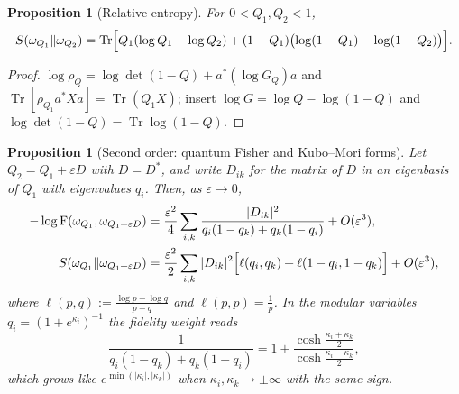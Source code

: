 \documentclass[11pt]{article}
\theoremstyle{accent}
\newtheorem{proposition}[theorem]{Proposition}
\theoremstyle{definition}
\newcommand{\Tr}{\operatorname{Tr}}
\newcommand{\eps}{\varepsilon}
\newcommand{\Fid}{\operatorname{F}}
\begin{document}
\begin{proposition}[Relative entropy]\label{prop:finite-relent}
For \(0<Q_1,Q_2<1\),
\begin{equation}\label{eq:finite-relent}
 S(\omega_{Q_1}\Vert\omega_{Q_2})
 =\Tr\Bigl[Q_1(\log Q_1-\log Q_2)+(1-Q_1)\bigl(\log(1-Q_1)-\log(1-Q_2)\bigr)\Bigr].
\end{equation}
\end{proposition}

\begin{proof}
\(\log\rho_Q=\log\det(1-Q)+a^*(\log G_Q)a\) and \(\Tr[\rho_{Q_1}a^*Xa]=\Tr(Q_1X)\); insert \(\log G=\log Q-\log(1-Q)\) and \(\log\det(1-Q)=\Tr\log(1-Q)\).
\end{proof}

\begin{proposition}[Second order: quantum Fisher and Kubo--Mori forms]\label{prop:second-order}
Let \(Q_2=Q_1+\eps D\) with \(D=D^*\), and write \(D_{ik}\) for the matrix of \(D\) in an eigenbasis of \(Q_1\) with eigenvalues \(q_i\).  Then, as \(\eps\to0\),
\begin{align}
 -\log\Fid(\omega_{Q_1},\omega_{Q_1+\eps D})
 &=\frac{\eps^2}{4}\sum_{i,k}\frac{|D_{ik}|^2}{q_i(1-q_k)+q_k(1-q_i)}+O(\eps^3),
 \label{eq:qfi}\\
 S(\omega_{Q_1}\Vert\omega_{Q_1+\eps D})
 &=\frac{\eps^2}{2}\sum_{i,k}|D_{ik}|^2\Bigl[\ell(q_i,q_k)+\ell(1-q_i,1-q_k)\Bigr]+O(\eps^3),
 \label{eq:kubo-mori}
\end{align}
where \(\ell(p,q):=\frac{\log p-\log q}{p-q}\) and \(\ell(p,p)=\frac1p\).
In the modular variables \(q_i=(1+e^{\kappa_i})^{-1}\) the fidelity weight reads
\begin{equation}\label{eq:qfi-weight}
 \frac{1}{q_i(1-q_k)+q_k(1-q_i)}
 =1+\frac{\cosh\frac{\kappa_i+\kappa_k}{2}}{\cosh\frac{\kappa_i-\kappa_k}{2}},
\end{equation}
which grows like \(e^{\min(|\kappa_i|,|\kappa_k|)}\) when \(\kappa_i,\kappa_k\to\pm\infty\) with the same sign.
\end{proposition}
\end{document}

